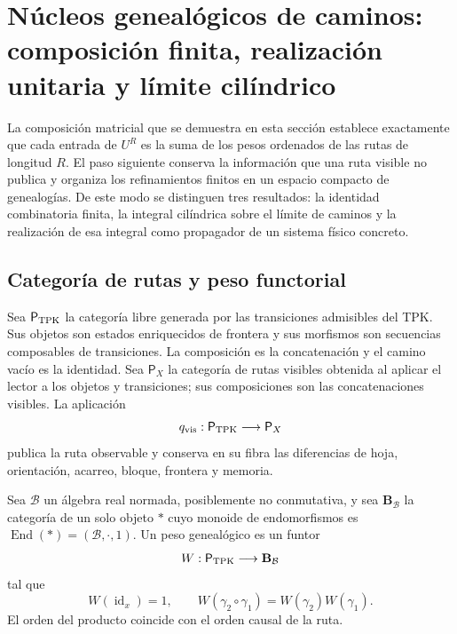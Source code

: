 \section{Núcleos genealógicos de caminos: composición finita, realización unitaria y límite cilíndrico}
\label{sec:integral-genealogica-caminos-rev2}

La composición matricial que se demuestra en esta sección establece exactamente que cada entrada de
\(U^R\) es la suma de los pesos ordenados de las rutas de longitud \(R\).
El paso siguiente conserva la información que una ruta visible no publica y
organiza los refinamientos finitos en un espacio compacto de genealogías. De
este modo se distinguen tres resultados: la identidad combinatoria finita, la
integral cilíndrica sobre el límite de caminos y la realización de esa
integral como propagador de un sistema físico concreto.

\subsection{Categoría de rutas y peso functorial}

Sea \(\mathsf P_{\rm TPK}\) la categoría libre generada por las transiciones
admisibles del TPK. Sus objetos son estados enriquecidos de frontera y sus
morfismos son secuencias composables de transiciones. La composición es la
concatenación y el camino vacío es la identidad. Sea \(\mathsf P_X\)
la categoría de rutas visibles obtenida al aplicar el lector a los
objetos y transiciones; sus composiciones son las concatenaciones visibles.
La aplicación
\[
 q_{\rm vis}:\mathsf P_{\rm TPK}\longrightarrow\mathsf P_X
\]
publica la ruta observable y conserva en su fibra las diferencias de hoja,
orientación, acarreo, bloque, frontera y memoria.

\begin{definition}
\label{def:peso-genealogico-caminos-rev2}
Sea \(\mathcal B\) un álgebra real normada, posiblemente no conmutativa, y
sea \(\mathbf B_{\mathcal B}\) la categoría de un solo objeto \(\ast\) cuyo
monoide de endomorfismos es
\(\operatorname{End}(\ast)=(\mathcal B,\cdot,1)\). Un peso genealógico es un funtor
\[
 W:\mathsf P_{\rm TPK}\longrightarrow\mathbf B_{\mathcal B}
\]
tal que
\[
 W(\operatorname{id}_x)=1,
 \qquad
 W(\gamma_2\circ\gamma_1)=W(\gamma_2)W(\gamma_1).
\]
El orden del producto coincide con el orden causal de la ruta.
\end{definition}

